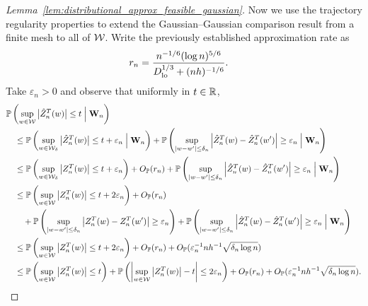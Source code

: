 \begin{proof}[Lemma~\ref{lem:distributional_approx_feasible_gaussian}]

  Now we use the trajectory regularity properties to
  extend the Gaussian--Gaussian comparison result from a finite mesh
  to all of $\mathcal{W}$.
  Write the previously established
  approximation rate as
  \begin{align*}
    r_n
    &=
    \frac{n^{-1/6}(\log n)^{5/6}}
    {D_{\textup{lo}}^{1/3} + (nh)^{-1/6}}.
  \end{align*}
  Take $\varepsilon_n > 0$ and observe that
  uniformly in $t \in \mathbb{R}$,
  \begin{align*}
    &\P\left(
      \sup_{w \in \cW}
      \big| \hat Z_n^T(w) \big|
      \leq t
      \Bigm\vert \bW_n
    \right) \\
    &\quad\leq
    \P\left(
      \sup_{w \in \cW_\delta}
      \big| \hat Z_n^T(w) \big|
      \leq t + \varepsilon_n
      \Bigm\vert \bW_n
    \right)
    + \P\left(
      \sup_{|w-w'| \leq \delta_n}
      \left|
      \hat Z_n^T(w)
      - \hat Z_n^T(w')
      \right|
      \geq \varepsilon_n
      \Bigm\vert \bW_n
    \right) \\
    &\quad\leq
    \P\left(
      \sup_{w \in \cW_\delta}
      \big| Z_n^T(w) \big|
      \leq t + \varepsilon_n
    \right)
    + O_\P(r_n)
    + \P\left(
      \sup_{|w-w'| \leq \delta_n}
      \left|
      \hat Z_n^T(w)
      - \hat Z_n^T(w')
      \right|
      \geq \varepsilon_n
      \Bigm\vert \bW_n
    \right) \\
    &\quad\leq
    \P\left(
      \sup_{w \in \cW}
      \big| Z_n^T(w) \big|
      \leq t + 2\varepsilon_n
    \right)
    + O_\P(r_n) \\
    &\qquad+
    \P\left(
      \sup_{|w-w'| \leq \delta_n}
      \left|
      Z_n^T(w)
      - Z_n^T(w')
      \right|
      \geq \varepsilon_n
    \right)
    + \P\left(
      \sup_{|w-w'| \leq \delta_n}
      \left|
      \hat Z_n^T(w)
      - \hat Z_n^T(w')
      \right|
      \geq \varepsilon_n
      \Bigm\vert \bW_n
    \right) \\
    &\quad\leq
    \P\left(
      \sup_{w \in \cW}
      \big| Z_n^T(w) \big|
      \leq t + 2\varepsilon_n
    \right)
    + O_\P(r_n)
    + O_\P(\varepsilon_n^{-1} nh^{-1} \sqrt{\delta_n \log n}) \\
    &\quad\leq
    \P\left(
      \sup_{w \in \cW}
      \big| Z_n^T(w) \big|
      \leq t
    \right)
    + \P\left(
      \left|
      \sup_{w \in \cW}
      \big| Z_n^T(w) \big|
      - t
      \right|
      \leq 2\varepsilon_n
    \right)
    + O_\P(r_n)
    + O_\P(\varepsilon_n^{-1} nh^{-1} \sqrt{\delta_n \log n}).

\end{align*}
\end{proof}
